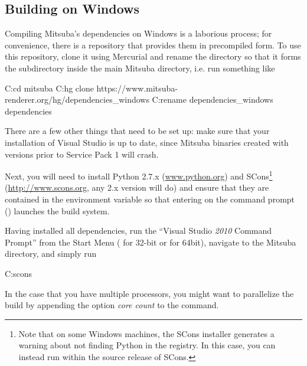 
\subsection{Building on Windows}
Compiling Mitsuba's dependencies on Windows is a laborious process; for convenience, there
is a repository that provides them in precompiled form. To use this repository, clone it
using Mercurial and rename the directory so that it forms the  subdirectory
inside the main Mitsuba directory, i.e. run something like
\begin{shell}
C:\>cd mitsuba
C:\mitsuba\>hg clone https://www.mitsuba-renderer.org/hg/dependencies_windows
C:\mitsuba\>rename dependencies_windows dependencies
\end{shell}
There are a few other things that need to be set up: make sure that your
installation of Visual Studio is up to date, since Mitsuba binaries created with versions
prior to Service Pack 1 will crash.

Next, you will need to install Python 2.7.x
(\url{www.python.org}) and SCons\footnote{Note that on some Windows machines, the SCons
installer generates a warning about not finding Python in the registry. In this case, you
can instead run  within the source release of SCons.}
(\url{http://www.scons.org}, any 2.x version will do) and ensure that they are contained in the 
environment variable so that entering  on the command prompt ()
launches the build system.

Having installed all dependencies, run the ``Visual Studio \emph{2010} Command
Prompt'' from the Start Menu ( for 32-bit or  for 64bit),
navigate to the Mitsuba directory, and simply run
\begin{shell}
C:\mitsuba\>scons
\end{shell}
In the case that you have multiple processors, you might want to parallelize the build by appending the option \emph{core count} to the  command.

